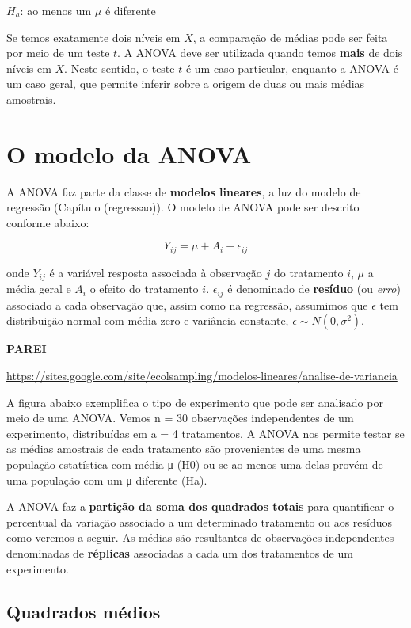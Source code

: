 \documentclass[
]{book}
\begin{document}
\(H_a\): ao menos um \(\mu\) é diferente

Se temos exatamente dois níveis em \(X\), a comparação de médias pode ser feita por meio de um teste \(t\). A ANOVA deve ser utilizada quando temos \textbf{mais} de dois níveis em \(X\). Neste sentido, o teste \(t\) é um caso particular, enquanto a ANOVA é um caso geral, que permite inferir sobre a origem de duas ou mais médias amostrais.

\hypertarget{o-modelo-da-anova}{%
\section{O modelo da ANOVA}\label{o-modelo-da-anova}}

A ANOVA faz parte da classe de \textbf{modelos lineares}, a luz do modelo de regressão (Capítulo (regressao)). O modelo de ANOVA pode ser descrito conforme abaixo:

\[Y_{ij} = \mu + A_i + \epsilon_{ij}\]

onde \(Y_{ij}\) é a variável resposta associada à observação \(j\) do tratamento \(i\), \(\mu\) a média geral e \(A_i\) o efeito do tratamento \(i\). \(\epsilon_{ij}\) é denominado de \textbf{resíduo} (ou \emph{erro}) associado a cada observação que, assim como na regressão, assumimos que \(\epsilon\) tem distribuição normal com média zero e variância constante, \(\epsilon \sim N(0, \sigma^2)\).

\textbf{PAREI}

\url{https://sites.google.com/site/ecolsampling/modelos-lineares/analise-de-variancia}

A figura abaixo exemplifica o tipo de experimento que pode ser analisado por meio de uma ANOVA. Vemos n = 30 observações independentes de um experimento, distribuídas em a = 4 tratamentos. A ANOVA nos permite testar se as médias amostrais de cada tratamento são provenientes de uma mesma população estatística com média μ (H0) ou se ao menos uma delas provém de uma população com um μ diferente (Ha).

A ANOVA faz a \textbf{partição da soma dos quadrados totais} para quantificar o percentual da variação associado a um determinado tratamento ou aos resíduos como veremos a seguir. As médias são resultantes de observações independentes denominadas de \textbf{réplicas} associadas a cada um dos tratamentos de um experimento.

\hypertarget{quadrados-muxe9dios}{%
\subsection{Quadrados médios}\label{quadrados-muxe9dios}}
\end{document}
